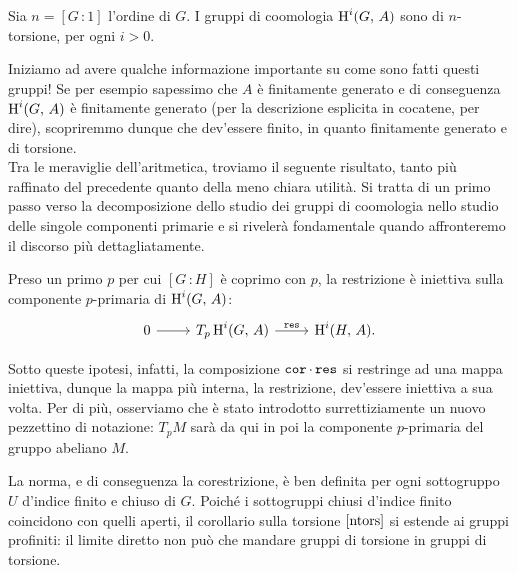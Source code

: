 \begin{corollary}\label{ntors}
	Sia $ n = [G 	\,\colon 1] $ l'ordine di $ G $. I gruppi di coomologia $ \operatorname{H}^i(G, \, A) $ sono di $ n $-torsione, per ogni $ i > 0 $.
\end{corollary}

Iniziamo ad avere qualche informazione importante su come sono fatti questi gruppi! Se per esempio sapessimo che $ A $ è finitamente generato e di conseguenza $ \operatorname{H}^i(G, \, A) $ è finitamente generato (per la descrizione esplicita in cocatene, per dire), scopriremmo dunque che dev'essere finito, in quanto finitamente generato e di torsione. \\

Tra le meraviglie dell'aritmetica, troviamo il seguente risultato, tanto più raffinato del precedente quanto della meno chiara utilità. Si tratta di un primo passo verso la decomposizione dello studio dei gruppi di coomologia nello studio delle singole componenti primarie e si rivelerà fondamentale quando affronteremo il discorso più dettagliatamente.

\begin{lemma}\label{injp}
	Preso un primo $ p $ per cui $ [G \, \colon H] $ è coprimo con $ p $, la restrizione è iniettiva sulla componente $ p $-primaria di $ \operatorname{H}^i(G, \, A) $:
	\[ \begin{tikzcd}
	0 \rar & T_p \HH^i(G, \, A) \rar["\Res"] & \HH^i(H, \, A).
	\end{tikzcd}\]
\end{lemma}

Sotto queste ipotesi, infatti, la composizione $ \operatorname{\mathtt{cor}} \cdot \operatorname{\mathtt{res}} $ si restringe ad una mappa iniettiva, dunque la mappa più interna, la restrizione, dev'essere iniettiva a sua volta. Per di più, osserviamo che è stato introdotto surrettiziamente un nuovo pezzettino di notazione: $ T_p M $ sarà da qui in poi la componente $ p $-primaria del gruppo abeliano $ M $. \\

\begin{profinite}
	La norma, e di conseguenza la corestrizione, è ben definita per ogni sottogruppo $ U $ d'indice finito e chiuso di $ G $.
	Poiché i sottogruppi chiusi d'indice finito coincidono con quelli aperti, il corollario sulla torsione $ \ref{ntors} $ si estende ai gruppi profiniti: il limite diretto non può che mandare gruppi di torsione in gruppi di torsione.
\end{profinite}

